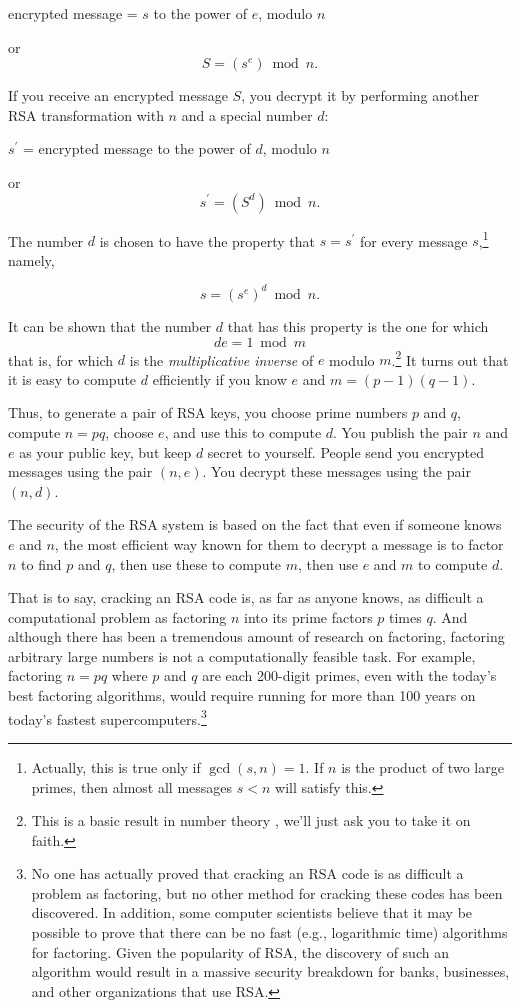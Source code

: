 \smallskip
\centerline{encrypted message = $s$ to the power of $e$, modulo $n$}
or 
\[S = (s^e) \bmod n.\]

If you receive an encrypted message $S$, you decrypt it by performing
another RSA transformation with $n$ and a special number $d$:

\smallskip \centerline{$s^\prime$ = encrypted message to the power of
$d$, modulo $n$} or \[s^\prime = (S^d) \bmod n.\]

The number $d$ is chosen to have the property that $s = s^\prime$ for
every message $s$,\footnote{Actually, this is true only if
$\gcd(s,n)=1$.  If $n$ is the product of two large primes, then almost
all messages $s<n$ will satisfy this.} namely,

\[s = (s^e)^d \bmod n.\]

It can be shown that the number $d$ that has this property is the one
for which
\begin{equation}
de=1 \bmod m
\end{equation}
that is, for which $d$ is the {\it multiplicative inverse} of $e$
modulo $m$.\footnote{This is a basic result in number theory , we'll
just ask you to take it on faith.} It turns out that it is easy to compute $d$
efficiently if you know $e$ and $m=(p-1)(q-1)$.

Thus, to generate a pair of RSA keys, you choose prime numbers $p$
and $q$, compute $n=pq$, choose $e$, and use this to compute $d$.
You publish the pair $n$ and $e$ as your public key, but keep $d$
secret to yourself.  People send you encrypted messages using the
pair $(n,e)$.  You decrypt these messages using the pair $(n,d)$.

The security of the RSA system is based on the fact that even if
someone knows $e$ and $n$, the most efficient way known for them to
decrypt a message is to factor $n$ to find $p$ and $q$, then use
these to compute $m$, then use $e$ and $m$ to compute $d$.

That is to say, cracking an RSA code is, as far as anyone knows, as
difficult a computational problem as factoring $n$ into its prime
factors $p$ times $q$.  And although there has been a tremendous
amount of research on factoring, factoring arbitrary large numbers is
not a computationally feasible task.  For example, factoring $n=pq$
where $p$ and $q$ are each 200-digit primes, even with the today's
best factoring algorithms, would require running for more than 100
years on today's fastest supercomputers.\footnote{No one has actually
proved that cracking an RSA code is as difficult a problem as
factoring, but no other method for cracking these codes has been
discovered.  In addition, some computer scientists believe that it
may be possible to prove that there can be no fast (e.g., logarithmic
time) algorithms for factoring.  Given the popularity of RSA, the
discovery of such an algorithm would result in a massive security
breakdown for banks, businesses, and other organizations that use
RSA.}


